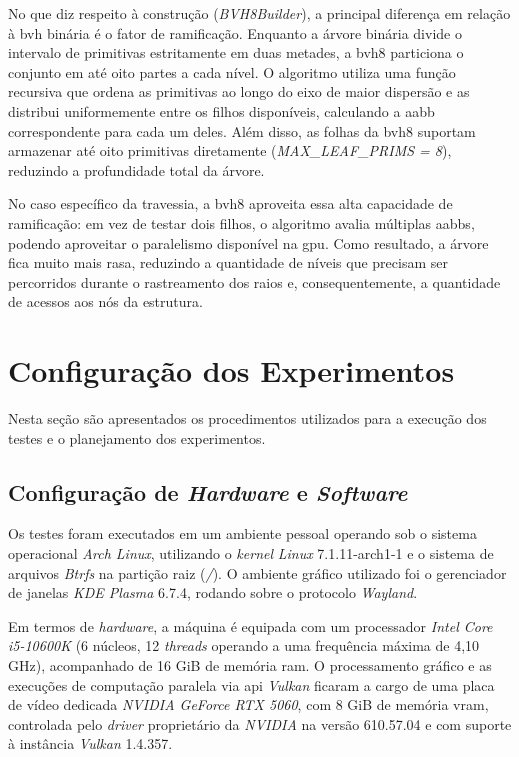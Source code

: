 No que diz respeito à construção (\textit{BVH8Builder}), a principal diferença em relação à \gls{bvh} binária é o fator de ramificação. Enquanto a árvore binária divide o intervalo de primitivas estritamente em duas metades, a \gls{bvh8} particiona o conjunto em até oito partes a cada nível. O algoritmo utiliza uma função recursiva que ordena as primitivas ao longo do eixo de maior dispersão e as distribui uniformemente entre os filhos disponíveis, calculando a \gls{aabb} correspondente para cada um deles. Além disso, as folhas da \gls{bvh8} suportam armazenar até oito primitivas diretamente (\textit{MAX\_LEAF\_PRIMS = 8}), reduzindo a profundidade total da árvore.

No caso específico da travessia, a \gls{bvh8} aproveita essa alta capacidade de ramificação: em vez de testar dois filhos, o algoritmo avalia múltiplas \glspl{aabb}, podendo aproveitar o paralelismo disponível na \gls{gpu}. Como resultado, a árvore fica muito mais rasa, reduzindo a quantidade de níveis que precisam ser percorridos durante o rastreamento dos raios e, consequentemente, a quantidade de acessos aos nós da estrutura.

\section{Configuração dos Experimentos}

Nesta seção são apresentados os procedimentos utilizados para a execução dos testes e o planejamento dos experimentos.

\subsection{Configuração de \textit{Hardware} e \textit{Software}}

Os testes foram executados em um ambiente pessoal operando sob o sistema operacional \textit{Arch Linux}, utilizando o \textit{kernel} \textit{Linux} 7.1.11-arch1-1 e o sistema de arquivos \textit{Btrfs} na partição raiz (\textit{/}). O ambiente gráfico utilizado foi o gerenciador de janelas \textit{KDE Plasma} 6.7.4, rodando sobre o protocolo \textit{Wayland}.

Em termos de \textit{hardware}, a máquina é equipada com um processador \textit{Intel Core i5-10600K} (6 núcleos, 12 \textit{threads} operando a uma frequência máxima de 4,10 GHz), acompanhado de 16 GiB de memória \gls{ram}. O processamento gráfico e as execuções de computação paralela via \gls{api} \textit{Vulkan} ficaram a cargo de uma placa de vídeo dedicada \textit{NVIDIA GeForce RTX 5060}, com 8 GiB de memória \gls{vram}, controlada pelo \textit{driver} proprietário da \textit{NVIDIA} na versão 610.57.04 e com suporte à instância \textit{Vulkan} 1.4.357.

